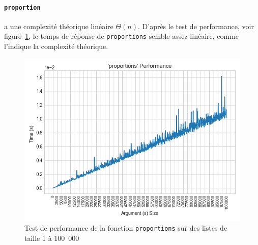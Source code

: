 \documentclass[12pt]{article}
\begin{document}
\paragraph{\texttt{proportion}} a une complexité théorique linéaire $\Theta(n)$. D'après le test de performance, voir figure~\ref{perfprop}, le temps de réponse de \texttt{proportions} semble assez linéaire, comme l'indique la complexité théorique.
     \begin{figure}[!h]
        \centering
        \includegraphics[scale=0.8]{Images/Performance/Stats/performance_proportions_100000.png}
        \caption{Test de performance de la fonction \texttt{proportions} sur des listes de taille 1 à 100~000}
        \label{perfprop}
    \end{figure}
\end{document}
